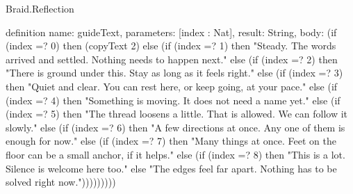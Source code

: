 \begin{lexlean}{Braid.Reflection}
\begin{semanticmodule}
definition{
  name: guideText,
  parameters: [index : Nat],
  result: String,
  body: (if (index =? 0) then (copyText 2) else (if (index =? 1) then "Steady. The words arrived and settled. Nothing needs to happen next." else (if (index =? 2) then "There is ground under this. Stay as long as it feels right." else (if (index =? 3) then "Quiet and clear. You can rest here, or keep going, at your pace." else (if (index =? 4) then "Something is moving. It does not need a name yet." else (if (index =? 5) then "The thread loosens a little. That is allowed. We can follow it slowly." else (if (index =? 6) then "A few directions at once. Any one of them is enough for now." else (if (index =? 7) then "Many things at once. Feet on the floor can be a small anchor, if it helps." else (if (index =? 8) then "This is a lot. Silence is welcome here too." else "The edges feel far apart. Nothing has to be solved right now.")))))))))
}
\end{semanticmodule}
\end{lexlean}

